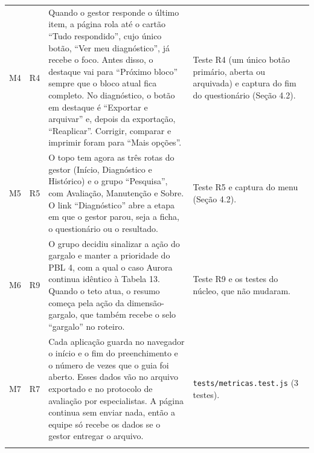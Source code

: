 \documentclass[11pt,a4paper]{article}
\begin{document}
{\begin{longtable}{L{0.7cm}L{1.7cm}L{8.0cm}L{3.6cm}}
M4 & R4 & Quando o gestor responde o último item, a página rola até o cartão ``Tudo respondido'', cujo único botão, ``Ver meu diagnóstico'', já recebe o foco. Antes disso, o destaque vai para ``Próximo bloco'' sempre que o bloco atual fica completo. No diagnóstico, o botão em destaque é ``Exportar e arquivar'' e, depois da exportação, ``Reaplicar''. Corrigir, comparar e imprimir foram para ``Mais opções''. & Teste R4 (um único botão primário, aberta ou arquivada) e captura do fim do questionário (Seção 4.2). \\ \addlinespace[2pt]
M5 & R5 & O topo tem agora as três rotas do gestor (Início, Diagnóstico e Histórico) e o grupo ``Pesquisa'', com Avaliação, Manutenção e Sobre. O link ``Diagnóstico'' abre a etapa em que o gestor parou, seja a ficha, o questionário ou o resultado. & Teste R5 e captura do menu (Seção 4.2). \\ \addlinespace[2pt]
M6 & R9 & O grupo decidiu sinalizar a ação do gargalo e manter a prioridade do PBL 4, com a qual o caso Aurora continua idêntico à Tabela 13. Quando o teto atua, o resumo começa pela ação da dimensão-gargalo, que também recebe o selo ``gargalo'' no roteiro. & Teste R9 e os testes do núcleo, que não mudaram. \\ \addlinespace[2pt]
M7 & R7 & Cada aplicação guarda no navegador o início e o fim do preenchimento e o número de vezes que o guia foi aberto. Esses dados vão no arquivo exportado e no protocolo de avaliação por especialistas. A página continua sem enviar nada, então a equipe só recebe os dados se o gestor entregar o arquivo. & \texttt{tests/metricas.test.js} (3 testes). \\ \addlinespace[2pt]
\end{longtable}}
\end{document}
